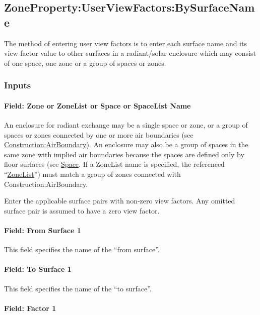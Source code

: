 \subsection{ZoneProperty:UserViewFactors:BySurfaceName}\label{zonepropertyuserviewfactorsbysurfacename}

The method of entering user view factors is to enter each surface name and its view factor value to other
surfaces in a radiant/solar enclosure which may consist of one space, one zone or a group of spaces or zones.

\subsubsection{Inputs}\label{inputs-17}

\paragraph{Field: Zone or ZoneList or Space or SpaceList Name}\label{zonepropertyuserviewfactorsbysurfacename-field-zone-name}

An enclosure for radiant exchange may be a single space or zone, or a group of spaces or zones connected by one or more air boundaries (see \hyperref[constructionairboundary]{Construction:AirBoundary}).  An enclosure may also be a group of spaces in the same zone with implied air boundaries because the spaces are defined only by floor surfaces (see \hyperref[space]{Space}.
If a ZoneList name is specified, the referenced ``\hyperref[zonelist]{ZoneList}'') must match a group of zones connected with Construction:AirBoundary.

Enter the applicable surface pairs with non-zero view factors. Any omitted surface pair is assumed to have a zero view factor.

\paragraph{Field: From Surface 1}\label{field-from-surface-1}

This field specifies the name of the ``from surface''.

\paragraph{Field: To Surface 1}\label{field-to-surface-1}

This field specifies the name of the ``to surface''.

\paragraph{Field: Factor 1}\label{field-factor-1}

